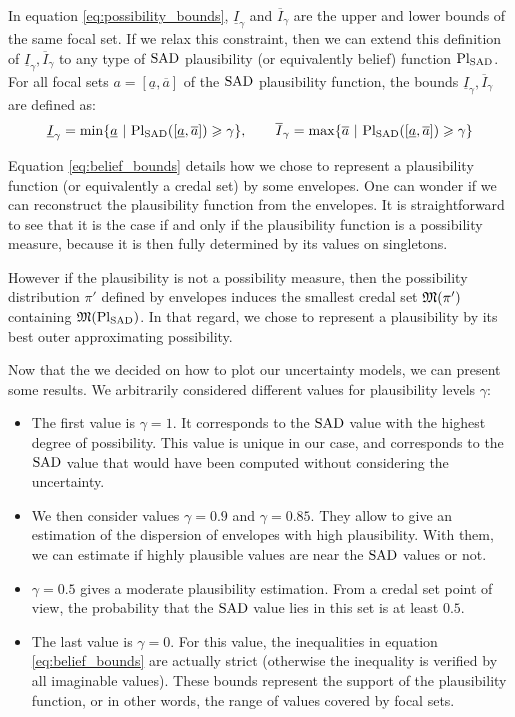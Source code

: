 In equation \eqref{eq:possibility_bounds}, $\underline{I}_\gamma$ and $\overline{I}_\gamma$ are the upper and lower bounds of the same focal set. If we relax this constraint, then we can extend this definition of $\underline{I}_\gamma, \overline{I}_\gamma$ to any type of ${\mathrm{SAD}}$ plausibility (or equivalently belief) function ${\mathrm{Pl}}_{\mathrm{SAD}}$. For all focal sets $a=[\underline{a}, \overline{a}]$ of the ${\mathrm{SAD}}$ plausibility function, the bounds $\underline{I}_\gamma, \overline{I}_\gamma$ are defined as:
\begin{align}\label{eq:belief_bounds}
    \underline{I}_\gamma = \min\{\underline{a} ~|~ {\mathrm{Pl}}_{\mathrm{SAD}}([\underline{a}, \overline{a}])\geqslant\gamma\}, \qquad \overline{I}_\gamma = \max\{\overline{a} ~|~ {\mathrm{Pl}}_{\mathrm{SAD}}([\underline{a}, \overline{a}])\geqslant\gamma\}
\end{align}

\begin{remark}
    Equation \eqref{eq:belief_bounds} details how we chose to represent a plausibility function (or equivalently a credal set) by some envelopes. One can wonder if we can reconstruct the plausibility function from the envelopes. It is straightforward to see that it is the case if and only if the plausibility function is a possibility measure, because it is then fully determined by its values on singletons.
    
    However if the plausibility is not a possibility measure, then the possibility distribution $\pi'$ defined by envelopes induces the smallest credal set ${\mathfrak{M}}(\pi')$ containing ${\mathfrak{M}}({\mathrm{Pl}}_{\mathrm{SAD}})$. In that regard, we chose to represent a plausibility by its best outer approximating possibility.
\end{remark}
Now that the we decided on how to plot our uncertainty models, we can present some results. We arbitrarily considered different values for plausibility levels $\gamma$:
\begin{itemize}
    \item The first value is $\gamma=1$. It corresponds to the ${\mathrm{SAD}}$ value with the highest degree of possibility. This value is unique in our case, and corresponds to the ${\mathrm{SAD}}$ value that would have been computed without considering the uncertainty.
    \item We then consider values $\gamma=0.9$ and $\gamma=0.85$. They allow to give an estimation of the dispersion of envelopes with high plausibility. With them, we can estimate if highly plausible values are near the ${\mathrm{SAD}}$ values or not.
    \item $\gamma=0.5$ gives a moderate plausibility estimation. From a credal set point of view, the probability that the ${\mathrm{SAD}}$ value lies in this set is at least $0.5$.
    \item The last value is $\gamma=0$. For this value, the inequalities in equation \eqref{eq:belief_bounds} are actually strict (otherwise the inequality is verified by all imaginable values). These bounds represent the support of the plausibility function, or in other words, the range of values covered by focal sets.
\end{itemize}

